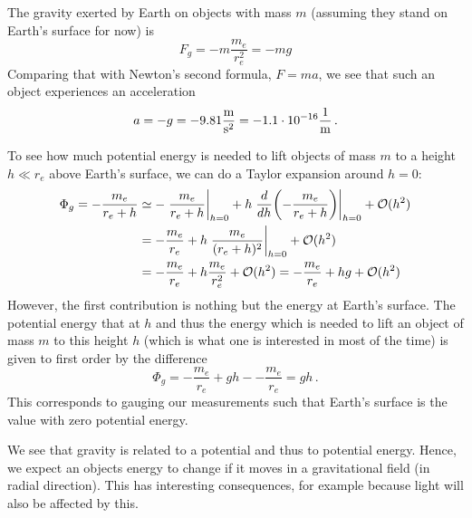 \begin{ex}
The gravity exerted by Earth on objects with mass $m$ (assuming they stand on Earth's surface for now) is
\begin{equation}
F_g = - m \frac{m_e}{r_e^2} = - m g
\end{equation}
Comparing that with Newton's second formula, $F = m a$, we see that such an object experiences an acceleration
\begin{equation}
a = - g = - 9.81 \frac{\metre}{\second^2} = - 1.1 \cdot 10^{-16} \frac{1}{\metre} \, .
\end{equation}

To see how much potential energy is needed to lift objects of mass $m$ to a height $h \ll r_e$ above Earth's surface, we can do a Taylor expansion around $h = 0$:
\begin{align*}
\Phi_g = - \frac{m_e}{r_e + h} &\simeq - \eval{\frac{m_e}{r_e + h}}_{h = 0} + h \eval{\dv{h}\qty(- \frac{m_e}{r_e + h})}_{h = 0} + \mathcal{O}(h^2)
\\
&= - \frac{m_e}{r_e} + h \eval{\frac{m_e}{(r_e + h)^2}}_{h = 0} + \mathcal{O}(h^2)
\\
&= - \frac{m_e}{r_e} + h \frac{m_e}{r_e^2} + \mathcal{O}(h^2) = - \frac{m_e}{r_e} + h g + \mathcal{O}(h^2)
\end{align*}
However, the first contribution is nothing but the energy at Earth's surface. The potential energy that at $h$ and thus the energy which is needed to lift an object of mass $m$ to this height $h$ (which is what one is interested in most of the time) is given to first order by the difference
\begin{equation}
\Phi_g =  - \frac{m_e}{r_e} + g h - - \frac{m_e}{r_e} = g h \, .
\end{equation}
This corresponds to gauging our measurements such that Earth's surface is the value with zero potential energy.
\end{ex}


We see that gravity is related to a potential and thus to potential energy. Hence, we expect an objects energy to change if it moves in a gravitational field (in radial direction). This has interesting consequences, for example because light will also be affected by this.

